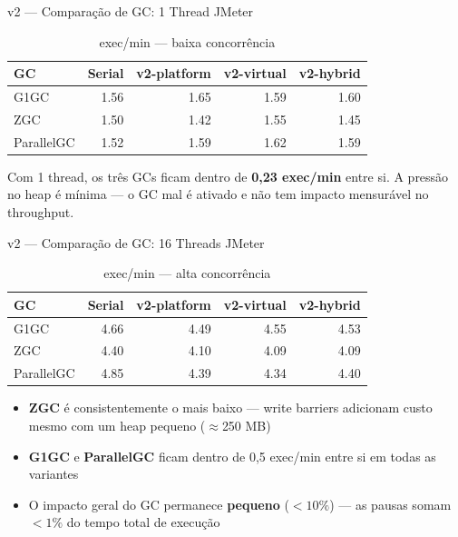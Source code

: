 \begin{frame}{v2 --- Comparação de GC: 1 Thread JMeter}
    \begin{table}
        \centering
        \begin{tabular}{lrrrr}
            \toprule
            \textbf{GC} & \textbf{Serial} & \textbf{v2-platform} & \textbf{v2-virtual} & \textbf{v2-hybrid} \\
            \midrule
            G1GC       & 1.56 & 1.65 & 1.59 & 1.60 \\
            ZGC        & 1.50 & 1.42 & 1.55 & 1.45 \\
            ParallelGC & 1.52 & 1.59 & 1.62 & 1.59 \\
            \bottomrule
        \end{tabular}
        \caption*{exec/min --- baixa concorrência}
    \end{table}

    \medskip
    Com 1 thread, os três GCs ficam dentro de \textbf{0,23 exec/min} entre si.
    A pressão no heap é mínima --- o GC mal é ativado e não tem impacto mensurável
    no throughput.
\end{frame}

\begin{frame}{v2 --- Comparação de GC: 16 Threads JMeter}
    \begin{table}
        \centering
        \begin{tabular}{lrrrr}
            \toprule
            \textbf{GC} & \textbf{Serial} & \textbf{v2-platform} & \textbf{v2-virtual} & \textbf{v2-hybrid} \\
            \midrule
            G1GC       & 4.66 & 4.49 & 4.55 & 4.53 \\
            \rowcolor{red!10}
            ZGC        & 4.40 & 4.10 & 4.09 & 4.09 \\
            ParallelGC & 4.85 & 4.39 & 4.34 & 4.40 \\
            \bottomrule
        \end{tabular}
        \caption*{exec/min --- alta concorrência}
    \end{table}

    \medskip
    \begin{itemize}
        \item \textbf{ZGC} é consistentemente o mais baixo --- write barriers adicionam
              custo mesmo com um heap pequeno ($\approx$250 MB)
        \item \textbf{G1GC} e \textbf{ParallelGC} ficam dentro de 0,5 exec/min entre si
              em todas as variantes
        \item O impacto geral do GC permanece \textbf{pequeno} ($< 10\%$) --- as pausas
              somam $< 1\%$ do tempo total de execução
    \end{itemize}
\end{frame}

